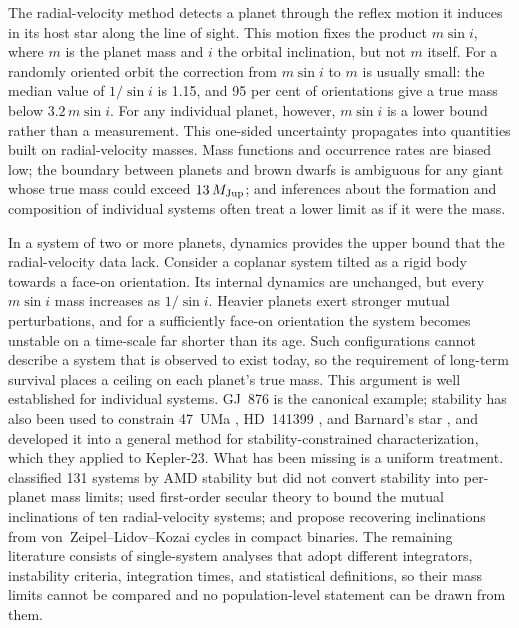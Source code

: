 \documentclass[fleqn,usenatbib]{mnras}
\newcommand{\msini}{m\sin i}
\newcommand{\mjup}{M_{\rm Jup}}
\begin{document}
The radial-velocity method detects a planet through the reflex motion it
induces in its host star along the line of sight. This motion fixes the
product $\msini$, where $m$ is the planet mass and $i$ the orbital
inclination, but not $m$ itself. For a randomly oriented orbit the
correction from $\msini$ to $m$ is usually small: the median value of
$1/\sin i$ is 1.15, and 95 per cent of orientations give a true mass below
$3.2\,\msini$. For any individual planet, however, $\msini$ is a lower
bound rather than a measurement. This one-sided uncertainty propagates
into quantities built on radial-velocity masses. Mass functions and
occurrence rates are biased low; the boundary between planets and brown
dwarfs is ambiguous for any giant whose true mass could exceed $13\,\mjup$;
and inferences about the formation and composition of individual systems
often treat a lower limit as if it were the mass.

In a system of two or more planets, dynamics provides the upper bound that
the radial-velocity data lack. Consider a coplanar system tilted as a
rigid body towards a face-on orientation. Its internal dynamics are
unchanged, but every $\msini$ mass increases as $1/\sin i$. Heavier
planets exert stronger mutual perturbations, and for a sufficiently
face-on orientation the system becomes unstable on a time-scale far
shorter than its age. Such configurations cannot describe a system that is
observed to exist today, so the requirement of long-term survival places a
ceiling on each planet's true mass. This argument is well established for
individual systems. GJ~876 is the canonical example; stability has also
been used to constrain 47~UMa \citep{Gozdziewski2002}, HD~141399
\citep{Vogt2014}, and Barnard's star \citep{Basant2025}, and
\citet{Tamayo2021} developed it into a general method for
stability-constrained characterization, which they applied to Kepler-23.
What has been missing is a uniform treatment. \citet{LaskarPetit2017}
classified 131 systems by AMD stability but did not convert stability into
per-planet mass limits; \citet{Volpi2019} used first-order secular theory
to bound the mutual inclinations of ten radial-velocity systems; and
\citet{Qin2025} propose recovering inclinations from
von~Zeipel--Lidov--Kozai cycles in compact binaries. The remaining
literature consists of single-system analyses that adopt different
integrators, instability criteria, integration times, and statistical
definitions, so their mass limits cannot be compared and no
population-level statement can be drawn from them.
\end{document}
